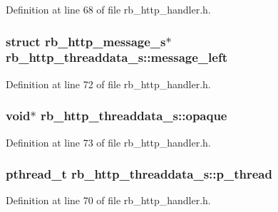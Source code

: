 Definition at line 68 of file rb\+\_\+http\+\_\+handler.\+h.

\hypertarget{structrb__http__threaddata__s_a5a0de7f05386fae47f1284bd82e3b7bf}{}
\subsubsection[{message\+\_\+left}]{\setlength{\rightskip}{0pt plus 5cm}struct {\bf rb\+\_\+http\+\_\+message\+\_\+s}$\ast$ rb\+\_\+http\+\_\+threaddata\+\_\+s\+::message\+\_\+left}\label{structrb__http__threaddata__s_a5a0de7f05386fae47f1284bd82e3b7bf}


Definition at line 72 of file rb\+\_\+http\+\_\+handler.\+h.

\hypertarget{structrb__http__threaddata__s_abbaa8b640f2517967ac2d5915a8e2d50}{}
\subsubsection[{opaque}]{\setlength{\rightskip}{0pt plus 5cm}void$\ast$ rb\+\_\+http\+\_\+threaddata\+\_\+s\+::opaque}\label{structrb__http__threaddata__s_abbaa8b640f2517967ac2d5915a8e2d50}


Definition at line 73 of file rb\+\_\+http\+\_\+handler.\+h.

\hypertarget{structrb__http__threaddata__s_a60069683f9f9fdb21769e171162da3f1}{}
\subsubsection[{p\+\_\+thread}]{\setlength{\rightskip}{0pt plus 5cm}pthread\+\_\+t rb\+\_\+http\+\_\+threaddata\+\_\+s\+::p\+\_\+thread}\label{structrb__http__threaddata__s_a60069683f9f9fdb21769e171162da3f1}


Definition at line 70 of file rb\+\_\+http\+\_\+handler.\+h.

\hypertarget{structrb__http__threaddata__s_a67e29737b4f8a0be3bdc23a22fed5a0c}{}
